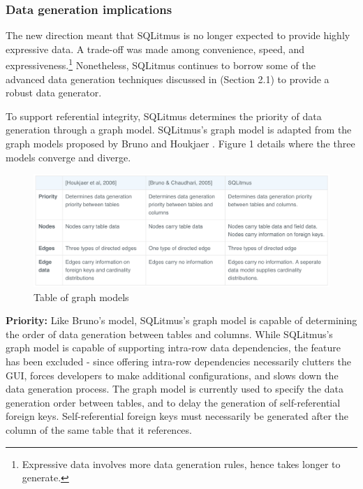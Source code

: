 \documentclass[12pt]{article}
\begin{document}
\begin{spacing}{1.9}
		
		
		\subsubsection{ Data generation implications}
		The new direction meant that SQLitmus is no longer expected to provide highly expressive data. A trade-off was made among convenience, speed, and expressiveness.\footnote{Expressive data involves more data generation rules, hence takes longer to generate.} Nonetheless, SQLitmus continues to borrow some of the advanced data generation techniques discussed in (Section 2.1) to provide a robust data generator.
		
		To support referential integrity, SQLitmus determines the priority of data generation through a graph model. SQLitmus's graph model is adapted from the graph models proposed by Bruno \cite{Bruno:2005} and Houkjaer \cite{Houkjaer:2006}. Figure 1 details where the three models converge and diverge.
		
		\begin{figure}[H]
			\centering
			\includegraphics[width=\textwidth]{2-3-1.png}
			\caption{Table of graph models}
			
		\end{figure}
		
		
		\textbf{Priority:} Like Bruno’s\cite{Bruno:2005} model, SQLitmus’s graph model is capable of determining the order of data generation between tables and columns. While SQLitmus’s graph model is capable of supporting intra-row data dependencies, the feature has been excluded - since offering intra-row dependencies necessarily clutters the GUI, forces developers to make additional configurations, and slows down the data generation process. The graph model is currently used to specify the data generation order between tables, and to delay the generation of self-referential foreign keys. Self-referential foreign keys must necessarily be generated after the column of the same table that it references.
		

\end{spacing}
\end{document}
